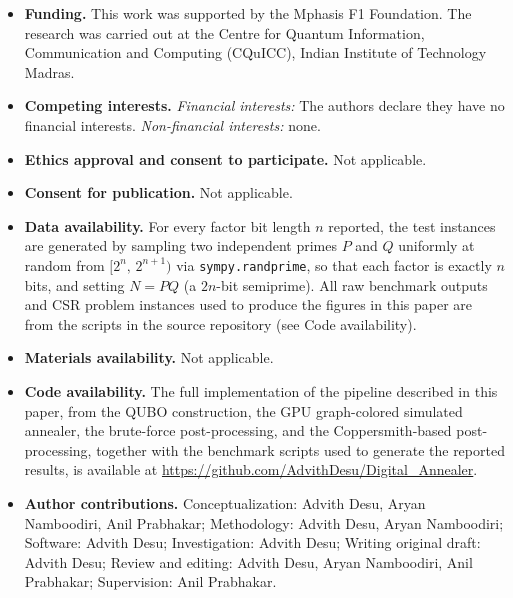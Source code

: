 \documentclass[pdflatex,sn-apa]{sn-jnl}%
\theoremstyle{thmstyleone}%
\theoremstyle{thmstyletwo}%
\theoremstyle{thmstylethree}%
\begin{document}
\begin{itemize}
\item \textbf{Funding.} This work was supported by the Mphasis F1 Foundation. The research was carried out at the Centre for Quantum Information, Communication and Computing (CQuICC), Indian Institute of Technology Madras.

\item \textbf{Competing interests.} \emph{Financial interests:} The authors declare they have no financial interests. \emph{Non-financial interests:} none.

\item \textbf{Ethics approval and consent to participate.} Not applicable.

\item \textbf{Consent for publication.} Not applicable.

\item \textbf{Data availability.} For every factor bit length $n$ reported, the test instances are generated by sampling two independent primes $P$ and $Q$ uniformly at random from $[2^{n},\, 2^{n + 1})$ via \texttt{sympy.randprime}, so that each factor is exactly $n$ bits, and setting $N = PQ$ (a $2n$-bit semiprime). All raw benchmark outputs and CSR problem instances used to produce the figures in this paper are from the scripts in the source repository (see Code availability).

\item \textbf{Materials availability.} Not applicable.

\item \textbf{Code availability.} The full implementation of the pipeline described in this paper, from the QUBO construction, the GPU graph-colored simulated annealer, the brute-force post-processing, and the Coppersmith-based post-processing, together with the benchmark scripts used to generate the reported results, is available at \url{https://github.com/AdvithDesu/Digital_Annealer}.

\item \textbf{Author contributions.} Conceptualization: Advith Desu, Aryan Namboodiri, Anil Prabhakar; Methodology: Advith Desu, Aryan Namboodiri; Software: Advith Desu; Investigation: Advith Desu; Writing original draft: Advith Desu; Review and editing: Advith Desu, Aryan Namboodiri, Anil Prabhakar; Supervision: Anil Prabhakar.
\end{itemize}
\end{document}
